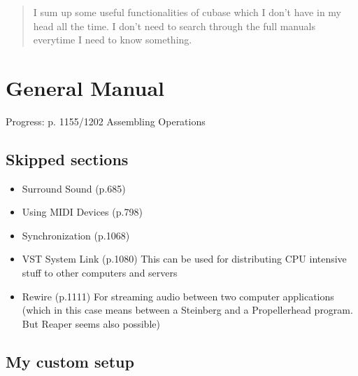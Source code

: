\documentclass[10pt]{article}
\begin{document}
\maketitle
\newpage

\tableofcontents
\newpage

\begin{abstract}
I sum up some useful functionalities of cubase which I don't have in my head all the time. I don't need to search through the full manuals everytime I need to know something.
\end{abstract}

\section{General Manual}\label{GeneralManual}

Progress: p. 1155/1202 Assembling Operations

\subsection{Skipped sections}

\begin{itemize}
	\item Surround Sound (p.685)
	\item Using MIDI Devices (p.798)
	\item Synchronization (p.1068)
	\item VST System Link (p.1080) This can be used for distributing CPU intensive stuff to other computers and servers
	\item Rewire (p.1111) For streaming audio between two computer applications (which in this case means between a Steinberg and a Propellerhead program. But Reaper seems also possible)
\end{itemize}

\subsection{My custom setup}\hypertarget{CustomSetup}{}
\end{document}
